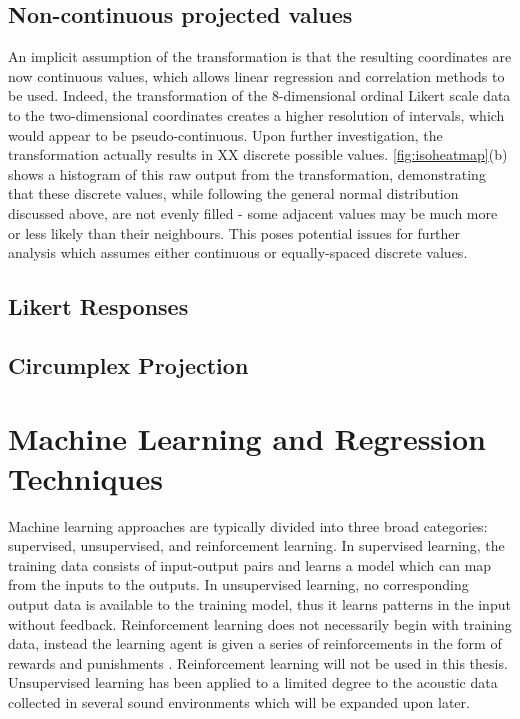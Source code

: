 \subsection{Non-continuous projected values}
An implicit assumption of the transformation is that the resulting coordinates are now continuous values, which allows linear regression and correlation methods to be used. Indeed, the transformation of the 8-dimensional ordinal Likert scale data to the two-dimensional coordinates creates a higher resolution of intervals, which would appear to be pseudo-continuous. Upon further investigation, the transformation actually results in XX discrete possible values. \cref{fig:isoheatmap}(b) shows a histogram of this raw output from the transformation, demonstrating that these discrete values, while following the general normal distribution discussed above, are not evenly filled - some adjacent values may be much more or less likely than their neighbours. This poses potential issues for further analysis which assumes either continuous or equally-spaced discrete values.



 \subsection{Likert Responses}

 \subsection{Circumplex Projection}



\section{Machine Learning and Regression Techniques}
Machine learning approaches are typically divided into three broad categories: supervised, unsupervised, and reinforcement learning. In supervised learning, the training data consists of input-output pairs and learns a model which can map from the inputs to the outputs. In unsupervised learning, no corresponding output data is available to the training model, thus it learns patterns in the input without feedback. Reinforcement learning does not necessarily begin with training data, instead the learning agent is given a series of reinforcements in the form of rewards and punishments \citep{StuartRussell2021}. Reinforcement learning will not be used in this thesis. Unsupervised learning has been applied to a limited degree to the acoustic data collected in several sound environments which will be expanded upon later. 

